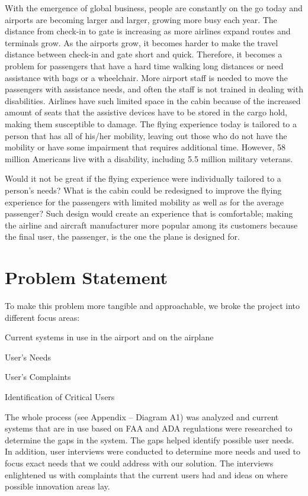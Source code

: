 \documentclass[a4paper, 12pt,conference]{new_cit_thesis}
\begin{document}
With the emergence of global business, people are constantly on the go today and airports are becoming larger and larger, growing more busy each year.  The distance from check-in to gate is increasing as more airlines expand routes and terminals grow.  As the airports grow, it becomes harder to make the travel distance between check-in and gate short and quick.  Therefore, it becomes a problem for passengers that have a hard time walking long distances or need assistance with bags or a wheelchair. More airport staff is needed to move the passengers with assistance needs, and often the staff is not trained in dealing with disabilities.  Airlines have such limited space in the cabin because of the increased amount of seats that the assistive devices have to be stored in the cargo hold, making them susceptible to damage.  The flying experience today is tailored to a person that has all of his/her mobility, leaving out those who do not have the mobility or have some impairment that requires additional time. However, 58 million Americans live with a disability, including 5.5 million military veterans. \cite{}

Would it not be great if the flying experience were individually tailored to a person’s needs? What is the cabin could be redesigned to improve the flying experience for the passengers with limited mobility as well as for the average passenger? Such design would create an experience that is comfortable; making the airline and aircraft manufacturer more popular among its customers because the final user, the passenger, is the one the plane is designed for.

\section{Problem Statement}
To make this problem more tangible and approachable, we broke the project into different focus areas:

\begin{list}{-}{}
  \item Current systems in use in the airport and on the airplane
  \item User’s Needs
  \item User’s Complaints
  \item Identification of Critical Users
\end{list}

The whole process (see Appendix – Diagram A1) was analyzed and current systems that are in use based on FAA and ADA regulations were researched to determine the gaps in the system.  The gaps helped identify possible user needs.  In addition, user interviews were conducted to determine more needs and used to focus exact needs that we could address with our solution.  The interviews enlightened us with complaints that the current users had and ideas on where possible innovation areas lay.
\end{document}

